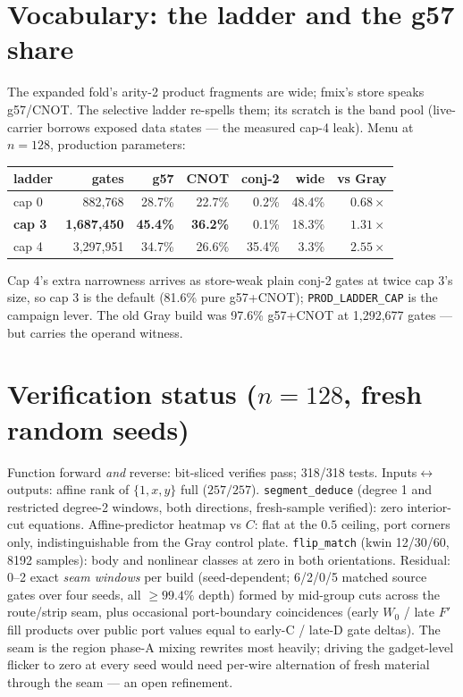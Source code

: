 \documentclass[11pt]{article}
\begin{document}
\section{Vocabulary: the ladder and the g57 share}

The expanded fold's arity-2 product fragments are wide; fmix's store
speaks g57/CNOT. The selective ladder re-spells them; its scratch is the
band pool (live-carrier borrows exposed data states --- the measured
cap-4 leak). Menu at $n=128$, production parameters:

\begin{center}
\begin{tabular}{lrrrrrr}
\toprule
ladder & gates & g57 & CNOT & conj-2 & wide & vs Gray \\
\midrule
cap 0 & 882{,}768 & 28.7\% & 22.7\% & 0.2\% & 48.4\% & $0.68\times$ \\
\textbf{cap 3} & \textbf{1{,}687{,}450} & \textbf{45.4\%} & \textbf{36.2\%} & 0.1\% & 18.3\% & $\mathbf{1.31\times}$ \\
cap 4 & 3{,}297{,}951 & 34.7\% & 26.6\% & 35.4\% & 3.3\% & $2.55\times$ \\
\bottomrule
\end{tabular}
\end{center}

\noindent Cap 4's extra narrowness arrives as store-weak plain conj-2
gates at twice cap 3's size, so cap 3 is the default (81.6\% pure
g57+CNOT); \texttt{PROD\_LADDER\_CAP} is the campaign lever. The old
Gray build was 97.6\% g57+CNOT at 1{,}292{,}677 gates --- but carries
the operand witness.

\section{Verification status ($n=128$, fresh random seeds)}

Function forward \emph{and} reverse: bit-sliced verifies pass; 318/318
tests. Inputs$\leftrightarrow$outputs: affine rank of $\{1,x,y\}$ full
($257/257$). \texttt{segment\_deduce} (degree 1 and restricted degree-2
windows, both directions, fresh-sample verified): zero interior-cut
equations. Affine-predictor heatmap vs $C$: flat at the $0.5$ ceiling,
port corners only, indistinguishable from the Gray control plate.
\texttt{flip\_match} (kwin 12/30/60, 8192 samples): body and nonlinear
classes at zero in both orientations. Residual: 0--2 exact \emph{seam
windows} per build (seed-dependent; 6/2/0/5 matched source gates over
four seeds, all $\ge 99.4\%$ depth) formed by mid-group cuts across the
route/strip seam, plus occasional port-boundary coincidences (early
$W_0$ / late $F'$ fill products over public port values equal to
early-C / late-D gate deltas). The seam is the region phase-A mixing
rewrites most heavily; driving the gadget-level flicker to zero at every
seed would need per-wire alternation of fresh material through the seam
--- an open refinement.
\end{document}
